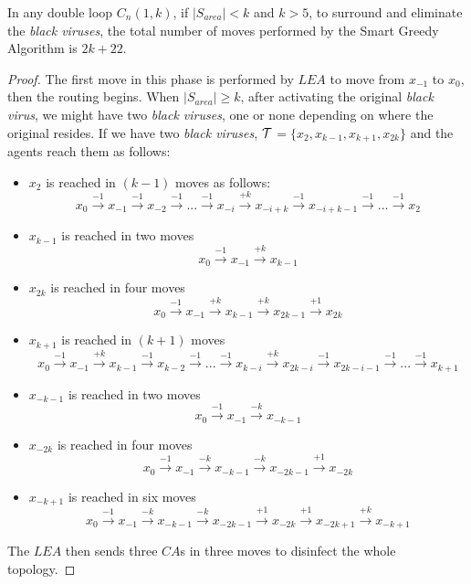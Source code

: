 \begin{theorem}
In any double loop  $C_n(1,k)$,  if $\left\vert{S_{area}}\right\vert < k$ and $k>5$, to surround and eliminate the {\it black viruses},
 the total number of moves performed by the Smart Greedy Algorithm is $2k+22$.
\end{theorem}
\begin{proof}
The first move in this phase is performed by $LEA$ to move from $x_{-1}$ to $x_0$, then the routing begins.
When  $\left\vert{S_{area}}\right\vert \ge k$, after activating the original {\it black virus}, we might have two {\it black viruses}, one \bv or none depending on where the original \bv resides.
If we have two {\it black viruses}, ${\cal T}$$=\{x_{2},x_{k-1},x_{k+1},x_{2k}\}$ and the agents reach them as follows:
\begin{itemize}
\item $x_{2}$ is reached in $(k-1)$ moves as follows:
$$x_{0} \xrightarrow {-1} x_{-1} \xrightarrow {-1} x_{-2} \xrightarrow {-1}... \xrightarrow {-1} x_{-i} \xrightarrow {+k} x_{-i+k} \xrightarrow {-1} x_{-i+k-1} \xrightarrow {-1} ... \xrightarrow {-1} x_{2}$$
\item $x_{k-1}$ is reached in two moves
$$x_{0} \xrightarrow {-1} x_{-1} \xrightarrow {+k} x_{k-1}$$
\item $x_{2k}$ is reached in four moves
$$x_{0} \xrightarrow {-1} x_{-1} \xrightarrow {+k} x_{k-1} \xrightarrow {+k} x_{2k-1} \xrightarrow {+1} x_{2k}$$
\item $x_{k+1}$ is reached in $(k+1)$ moves
$$x_{0} \xrightarrow {-1} x_{-1} \xrightarrow {+k} x_{k-1} \xrightarrow {-1} x_{k-2} \xrightarrow {-1} ... \xrightarrow {-1} x_{k-i} \xrightarrow {+k} x_{2k-i} \xrightarrow {-1} x_{2k-i-1} \xrightarrow {-1} ... \xrightarrow {-1} x_{k+1}$$
 \item $x_{-k-1}$ is reached in two moves
$$x_{0} \xrightarrow {-1} x_{-1} \xrightarrow {-k} x_{-k-1}$$
\item $x_{-2k}$ is reached in four moves
$$x_{0} \xrightarrow {-1} x_{-1} \xrightarrow {-k} x_{-k-1} \xrightarrow {-k} x_{-2k-1} \xrightarrow {+1} x_{-2k}$$
\item $x_{-k+1}$ is reached in six moves
$$x_{0} \xrightarrow {-1} x_{-1} \xrightarrow {-k} x_{-k-1} \xrightarrow {-k} x_{-2k-1} \xrightarrow {+1} x_{-2k} \xrightarrow {+1} x_{-2k+1} \xrightarrow {+k} x_{-k+1}$$
\end{itemize}
The $LEA$ then sends three $CA$s in three moves to disinfect the whole topology.
 
\end{proof}

